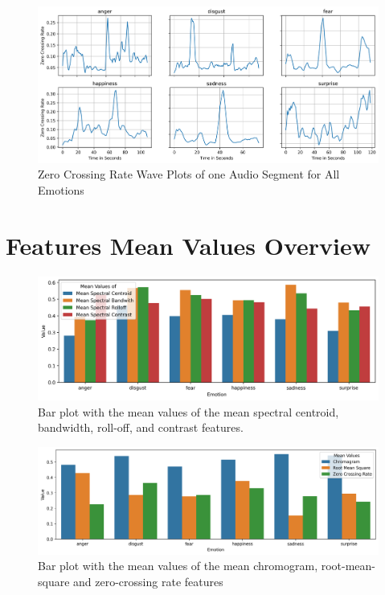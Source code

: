 \begin{figure}[H]
	\centering
	\includegraphics[width=.9\linewidth]{figs/appendix/feature_selection/zcrWP.png}
	\caption{Zero Crossing Rate Wave Plots of one Audio Segment for All Emotions}
	\label{fig:zcrWP}
\end{figure}

\section{Features Mean Values Overview}


\begin{figure}[H]
	\centering
	\includegraphics[width=\textwidth]{figs/appendix/feature_selection/meanSpectralFeatBarPlot.png}
	\caption{Bar plot with the mean values of the mean spectral centroid, bandwidth, roll-off, and contrast features.}
	\label{fig:meanSpectralFeatBarPlot}
\end{figure}

\begin{center}
	\begin{figure}[H]
		\centering
		\includegraphics[width=1\linewidth]{figs/appendix/feature_selection/meanOtherFeatBarPlot.png}
		\caption{Bar plot with the mean values of the mean chromogram, root-mean-square and zero-crossing rate features}
		\label{fig:meanFeatBarPlot}
	\end{figure}
\end{center}

